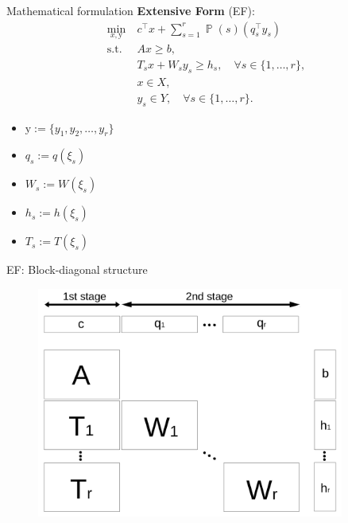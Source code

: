 \documentclass{beamer}
\DeclareMathOperator*{\PP}{\mathbb{P}}
\begin{document}
	\begin{frame}{Mathematical formulation}
	\textbf{Extensive Form} (EF):
	\begin{subequations}\label{sip:ef}
		\begin{align}
		\min_{x,\mathrm{y}}\ &c^{\top}x + \sum_{s=1}^{r}\PP(s) (q_s^{\top}y_s) \label{ef:obj}\\ 
		\mathrm{s.t.}\ &Ax\ge b,  \label{ef:b}\\
		&T_s x+W_s y_s\ge h_s,\quad\forall s\in\{1,\ldots,r\}, \label{ef:c} \\
		&x\in X, \label{ef:d} \\
		&y_s \in Y,\quad\forall s\in\{1,\ldots,r\}. \label{ef:e}
		\end{align}
	\end{subequations}
	\vspace{-0.4cm}
	\begin{itemize}
		\item $\mathrm{y}:=\{y_1,y_2,\ldots,y_r\}$
		\item $q_s:=q(\xi_s)$
		\item $W_s:=W(\xi_s)$
		\item $h_s:=h(\xi_s)$
		\item $T_s:=T(\xi_s)$
	\end{itemize}
	\end{frame}
	
	\begin{frame}{EF: Block-diagonal structure}
		\begin{figure}
			\begin{center}
				\includegraphics[width=0.9\textwidth]{stagewise_sparsity_slide}
			\end{center}
		\end{figure}
	\end{frame}
\end{document}
